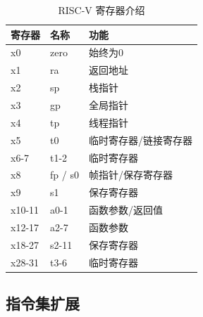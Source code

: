 \begin{table}[htbp]
	\centering
	\caption{RISC-V 寄存器介绍}
	\begin{tabularx}{\textwidth}{>{\centering\arraybackslash}X >{\centering\arraybackslash}X >{\centering\arraybackslash}X}
		\toprule
		\textbf{寄存器} & \textbf{名称} & \textbf{功能} \\
		\midrule
		x0           & zero        & 始终为0        \\
		x1           & ra          & 返回地址        \\
		x2           & sp          & 栈指针         \\
		x3           & gp          & 全局指针        \\
		x4           & tp          & 线程指针        \\
		x5           & t0          & 临时寄存器/链接寄存器 \\
		x6-7         & t1-2        & 临时寄存器       \\
		x8           & fp / s0     & 帧指针/保存寄存器   \\
		x9           & s1          & 保存寄存器       \\
		x10-11       & a0-1        & 函数参数/返回值    \\
		x12-17       & a2-7        & 函数参数        \\
		x18-27       & s2-11       & 保存寄存器       \\
		x28-31       & t3-6        & 临时寄存器       \\
		\bottomrule
	\end{tabularx}
	\label{tab:riscv_instruction_register}
\end{table}

\subsection{指令集扩展}

